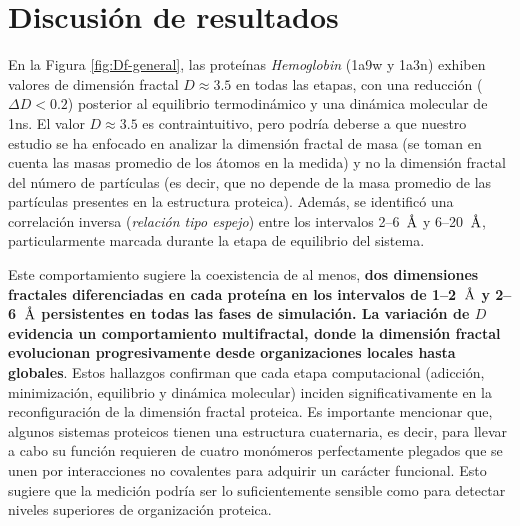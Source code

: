 	
	
	\section{Discusi\'{o}n de resultados}	
	
	En la Figura \ref{fig:Df-general}, las prote\'{i}nas \textit{Hemoglobin} (1a9w y 1a3n) exhiben valores de dimensi\'{o}n fractal $D \approx 3.5$ en todas las etapas, con una reducci\'{o}n  ($\Delta D < 0.2$) posterior al equilibrio termodin\'{a}mico y una din\'{a}mica molecular de 1ns. El valor $D \approx 3.5$  es contraintuitivo, pero podr\'{i}a deberse a que nuestro estudio se ha enfocado en analizar la dimensi\'{o}n fractal de masa (se toman en cuenta las masas promedio de los \'{a}tomos en la medida) y no la dimensi\'{o}n fractal del n\'{u}mero de part\'{i}culas (es decir, que no depende de la masa promedio de las part\'{i}culas presentes en la estructura proteica). Adem\'{a}s, se identific\'{o} una correlaci\'{o}n inversa (\emph{relaci\'{o}n tipo espejo}) entre los intervalos 2--6~$\textup{\r{A}}$ y 6--20~$\textup{\r{A}}$, particularmente marcada durante la etapa de equilibrio del sistema.
	
	Este comportamiento sugiere la coexistencia de al menos, \textbf{dos dimensiones fractales diferenciadas en cada prote\'{i}na en los intervalos de 1--2~$\textup{\r{A}}$ y 2--6~$\textup{\r{A}}$ persistentes en todas las fases de simulaci\'{o}n. La variaci\'{o}n de $D$ evidencia un comportamiento multifractal, donde la dimensi\'{o}n fractal evolucionan progresivamente desde organizaciones locales hasta globales}. Estos hallazgos confirman que cada etapa computacional (adicci\'{o}n, minimizaci\'{o}n, equilibrio y din\'{a}mica molecular) inciden significativamente en la reconfiguraci\'{o}n de la dimensi\'{o}n fractal proteica. Es importante mencionar que, algunos sistemas proteicos tienen una estructura cuaternaria, es decir, para llevar a cabo su funci\'{o}n requieren de cuatro mon\'{o}meros perfectamente plegados que se unen por interacciones no covalentes para adquirir un car\'{a}cter funcional. Esto sugiere que la medici\'{o}n podr\'{i}a ser lo suficientemente sensible como para detectar niveles superiores de organizaci\'{o}n proteica.
	
